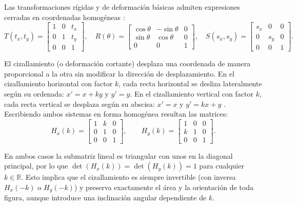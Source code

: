 \documentclass[a4paper,10pt]{article}
\begin{document}
Las transformaciones rígidas y de deformación básicas admiten expresiones cerradas en coordenadas homogéneas \citep{hearn2011}:
\begin{equation}
  T(t_x,t_y) = \begin{bmatrix} 1 & 0 & t_x \\ 0 & 1 & t_y \\ 0 & 0 & 1 \end{bmatrix}, \quad
  R(\theta) = \begin{bmatrix} \cos\theta & -\sin\theta & 0 \\ \sin\theta & \cos\theta & 0 \\ 0 & 0 & 1 \end{bmatrix}, \quad
  S(s_x,s_y) = \begin{bmatrix} s_x & 0 & 0 \\ 0 & s_y & 0 \\ 0 & 0 & 1 \end{bmatrix}.
\end{equation}

El cizallamiento (o deformación cortante) desplaza una coordenada de manera proporcional a la otra sin modificar la dirección de desplazamiento. En el cizallamiento horizontal con factor $k$, cada recta horizontal se desliza lateralmente según su ordenada: $x' = x + k y$ y $y' = y$. En el cizallamiento vertical con factor $k$, cada recta vertical se desplaza según su abscisa: $x' = x$ y $y' = k x + y$ \citep{hearn2011}. Escribiendo ambos sistemas en forma homogénea resultan las matrices:
\begin{equation}
  H_x(k) = \begin{bmatrix} 1 & k & 0 \\ 0 & 1 & 0 \\ 0 & 0 & 1 \end{bmatrix}, \qquad
  H_y(k) = \begin{bmatrix} 1 & 0 & 0 \\ k & 1 & 0 \\ 0 & 0 & 1 \end{bmatrix}.
\end{equation}

En ambos casos la submatriz lineal es triangular con unos en la diagonal principal, por lo que $\det(H_x(k)) = \det(H_y(k)) = 1$ para cualquier $k \in \mathbb{R}$. Esto implica que el cizallamiento es siempre invertible (con inversa $H_x(-k)$ o $H_y(-k)$) y preserva exactamente el área y la orientación de toda figura, aunque introduce una inclinación angular dependiente de $k$.
\end{document}
